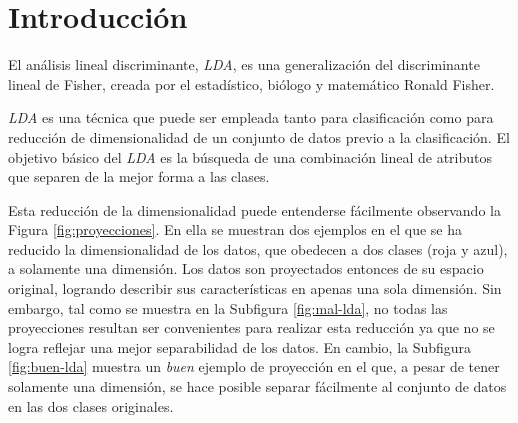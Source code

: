 \documentclass[journal]{IEEEtran}
\begin{document}
\section{Introducción}
\label{sec:introduccion}
El análisis lineal discriminante, \emph{LDA}, es una generalización del discriminante lineal de Fisher, creada por el estadístico, biólogo y matemático Ronald Fisher.

\emph{LDA} es una técnica que puede ser empleada tanto para clasificación como para reducción de dimensionalidad de un conjunto de datos previo a la clasificación.
El objetivo básico del \emph{LDA} es la búsqueda de una combinación lineal de atributos que separen de la mejor forma a las clases.

Esta reducción de la dimensionalidad puede entenderse fácilmente observando la Figura \ref{fig:proyecciones}.
En ella se muestran dos ejemplos en el que se ha reducido la dimensionalidad de los datos, que obedecen a dos clases (roja y azul), a solamente una dimensión.
Los datos son proyectados entonces de su espacio original, logrando describir sus características en apenas una sola dimensión.
Sin embargo, tal como se muestra en la Subfigura \ref{fig:mal-lda}, no todas las proyecciones resultan ser convenientes para realizar esta reducción ya que no se logra reflejar una mejor separabilidad de los datos.
En cambio, la Subfigura \ref{fig:buen-lda} muestra un \emph{buen} ejemplo de proyección en el que, a pesar de tener solamente una dimensión, se hace posible separar fácilmente al conjunto de datos en las dos clases originales.
\end{document}
